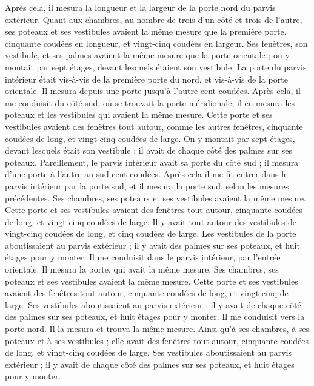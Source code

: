 \begin{multicols}{2}
Après cela, il mesura la longueur et la largeur de la porte nord du parvis extérieur.
Quant aux chambres, au nombre de trois d’un côté et trois de l’autre, ses poteaux et ses vestibules avaient la même mesure que la première porte, cinquante coudées en longueur, et vingt-cinq coudées en largeur.
Ses fenêtres, son vestibule, et ses palmes avaient la même mesure que la porte orientale ; on y montait par sept étages, devant lesquels étaient son vestibule.
La porte du parvis intérieur était vis-à-vis de la première porte du nord, et vis-à-vis de la porte orientale. Il mesura depuis une porte jusqu’à l'autre cent coudées.
Après cela, il me conduisit du côté sud, où se trouvait la porte méridionale, il en mesura les poteaux et les vestibules qui avaient la même mesure.
Cette porte et ses vestibules avaient des fenêtres tout autour, comme les autres fenêtres, cinquante coudées de long, et vingt-cinq coudées de large.
On y montait par sept étages, devant lesquels était son vestibule ; il avait de chaque côté des palmes sur ses poteaux.
Pareillement, le parvis intérieur avait sa porte du côté sud ; il mesura d’une porte à l’autre au sud cent coudées.
Après cela il me fit entrer dans le parvis intérieur par la porte sud, et il mesura la porte sud, selon les mesures précédentes.
Ses chambres, ses poteaux et ses vestibules avaient la même mesure. Cette porte et ses vestibules avaient des fenêtres tout autour, cinquante coudées de long, et vingt-cinq coudées de large.
Il y avait tout autour des vestibules de vingt-cinq coudées de long, et cinq coudées de large.
Les vestibules de la porte aboutissaient au parvis extérieur ; il y avait des palmes sur ses poteaux, et huit étages pour y monter.
Il me conduisit dans le parvis intérieur, par l’entrée orientale. Il mesura la porte, qui avait la même mesure.
Ses chambres, ses poteaux et ses vestibules avaient la même mesure. Cette porte et ses vestibules avaient des fenêtres tout autour, cinquante coudées de long, et vingt-cinq de large.
Ses vestibules aboutissaient au parvis extérieur ; il y avait de chaque côté des palmes sur ses poteaux, et huit étages pour y monter.
Il me conduisit vers la porte nord. Il la mesura et trouva la même mesure.
Ainsi qu’à ses chambres, à ses poteaux et à ses vestibules ; elle avait des fenêtres tout autour, cinquante coudées de long, et vingt-cinq coudées de large.
Ses vestibules aboutissaient au parvis extérieur ; il y avait de chaque côté des palmes sur ses poteaux, et huit étages pour y monter.

\end{multicols}
